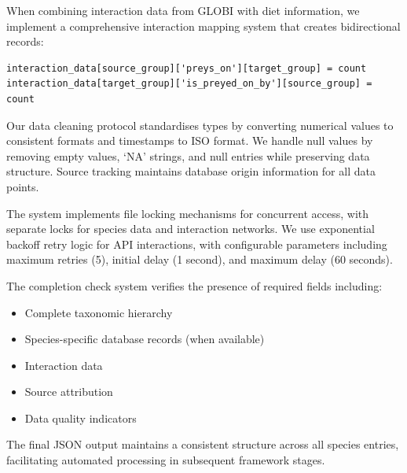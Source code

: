 When combining interaction data from GLOBI with diet information, we implement a comprehensive interaction mapping system that creates bidirectional records:

\begin{verbatim}
interaction_data[source_group]['preys_on'][target_group] = count
interaction_data[target_group]['is_preyed_on_by'][source_group] = count
\end{verbatim}

Our data cleaning protocol standardises types by converting numerical values to consistent formats and timestamps to ISO format. We handle null values by removing empty values, `NA' strings, and null entries while preserving data structure. Source tracking maintains database origin information for all data points.

The system implements file locking mechanisms for concurrent access, with separate locks for species data and interaction networks. We use exponential backoff retry logic for API interactions, with configurable parameters including maximum retries (5), initial delay (1 second), and maximum delay (60 seconds).

The completion check system verifies the presence of required fields including:
\begin{itemize}
\item Complete taxonomic hierarchy
\item Species-specific database records (when available)
\item Interaction data
\item Source attribution
\item Data quality indicators
\end{itemize}

The final JSON output maintains a consistent structure across all species entries, facilitating automated processing in subsequent framework stages.

\label{supp:diet_matrix}


